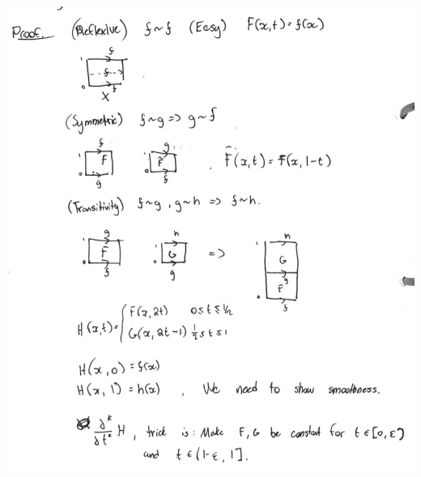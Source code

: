   \begin{center}
    \includegraphics[width=0.40\paperwidth]{difftop/week06/equivrel}

\end{center}
